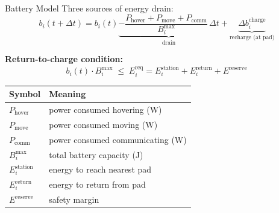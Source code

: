 \documentclass[aspectratio=169,12pt]{beamer}
\begin{document}
\begin{frame}{Battery Model}
Three sources of energy drain:
\[
b_i(t+\Delta t) = b_i(t)
\underbrace{- \frac{P_{\text{hover}} + P_{\text{move}} + P_{\text{comm}}}{B_i^{\max}}\,\Delta t}_{\text{drain}}
+ \underbrace{\Delta b_i^{\text{charge}}}_{\text{recharge (at pad)}}
\]

\vspace{0.5em}
\textbf{Return-to-charge condition:}
\[
b_i(t) \cdot B_i^{\max}
\;\le\;
E_i^{\text{req}}
= E_i^{\text{station}} + E_i^{\text{return}} + E^{\text{reserve}}
\]

\vspace{0.3em}
\begin{tabular}{@{}ll@{}}
\toprule
\textbf{Symbol} & \textbf{Meaning} \\
\midrule
$P_{\text{hover}}$ & power consumed hovering (W) \\
$P_{\text{move}}$ & power consumed moving (W) \\
$P_{\text{comm}}$ & power consumed communicating (W) \\
$B_i^{\max}$ & total battery capacity (J) \\
$E_i^{\text{station}}$ & energy to reach nearest pad \\
$E_i^{\text{return}}$ & energy to return from pad \\
$E^{\text{reserve}}$ & safety margin \\
\bottomrule
\end{tabular}
\end{frame}
\end{document}
